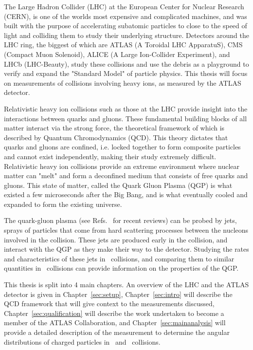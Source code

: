 

The Large Hadron Collider (LHC) at the European Center for Nuclear Research (CERN), is one of the worlds most expensive and complicated machines, and was built with the purpose of accelerating subatomic particles to close to the speed of light and colliding them to study their underlying structure. Detectors around the LHC ring, the biggest of which are  ATLAS (A Toroidal LHC ApparatuS), CMS (Compact Muon Solenoid), ALICE (A Large Ion-Collider Experiment), and LHCb (LHC-Beauty), study these collisions and use the debris as a playground to verify and expand the "Standard Model" of particle physics. This thesis will focus on measurements of collisions involving heavy ions, as measured by the  ATLAS detector.

Relativistic heavy ion collisions such as those at the LHC provide insight into the interactions between quarks and gluons. These fundamental building blocks of all matter interact via the strong force, the theoretical framework of which is described by Quantum Chromodynamics (QCD). This theory dictates that quarks and gluons are confined, i.e. locked together to form composite particles and cannot exist independently, making their study extremely difficult. Relativistic heavy ion collisions provide an extreme environment where nuclear matter can "melt" and form a deconfined medium that consists of free quarks and gluons. This state of matter, called the Quark Gluon Plasma (QGP) is what existed a few microseconds after the Big Bang, and is what eventually cooled and expanded to form the existing universe. 

The quark-gluon plasma (see Refs.~\cite{Roland:2014jsa,Busza:2018rrf} for recent reviews) can be probed by jets, sprays of particles that come from hard scattering processes between the nucleons involved in the collision. These jets are produced early in the collision, and interact with the QGP as they make their way to the detector. Studying the rates and characteristics of these jets in \pbpb\ collisions, and comparing them to similar quantities in \pp\ collisions can provide information on the properties of the QGP.

This thesis is split into 4 main chapters. An overview of the LHC and the ATLAS detector is given in Chapter~\ref{sec:setup}, Chapter~\ref{sec:intro} will describe the QCD framework that will give context to the measurements discussed, Chapter~\ref{sec:qualification} will describe the work undertaken to become a member of the ATLAS Collaboration, and Chapter~\ref{sec:mainanalysis} will provide a detailed description of the measurement to determine the angular distributions of charged particles in \pbpb\ and \pp\ collisions. 

